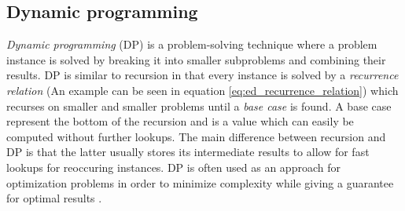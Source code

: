 \documentclass[thesis.tex]{subfiles}
\begin{document}
\subsection{Dynamic programming}
\label{sec:dynamic_programming}
\textit{Dynamic programming} (DP) is a problem-solving technique where a problem instance is solved by breaking it into smaller subproblems and combining their results. DP is similar to recursion in that every instance is solved by a \textit{recurrence relation} (An example can be seen in equation \ref{eq:ed_recurrence_relation}) which recurses on smaller and smaller problems until a \textit{base case} is found. A base case represent the bottom of the recursion and is a value which can easily be computed without further lookups. The main difference between recursion and DP is that the latter usually stores its intermediate results to allow for fast lookups for reoccuring instances. DP is often used as an approach for optimization problems in order to minimize complexity while giving a guarantee for optimal results \cite[Chapter 9]{algorithms_sequential_parallell_and_distributed}.\\
\par\noindent
\end{document}

